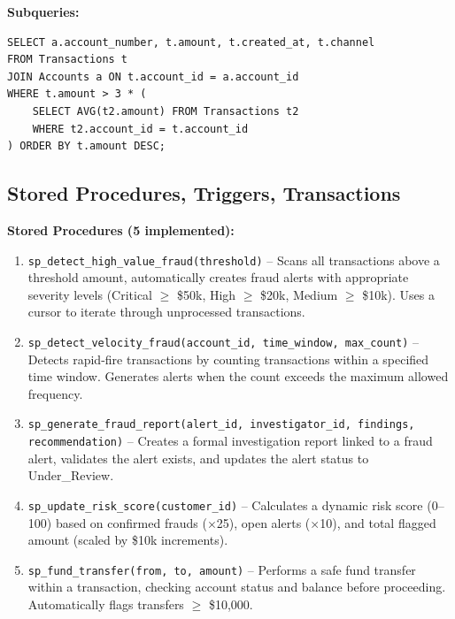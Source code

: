 \documentclass[a4paper,12pt]{article}
\begin{document}
\textbf{Subqueries:}
\begin{lstlisting}[style=sqlstyle, caption=Accounts with transactions exceeding 3x their average]
SELECT a.account_number, t.amount, t.created_at, t.channel
FROM Transactions t
JOIN Accounts a ON t.account_id = a.account_id
WHERE t.amount > 3 * (
    SELECT AVG(t2.amount) FROM Transactions t2 
    WHERE t2.account_id = t.account_id
) ORDER BY t.amount DESC;
\end{lstlisting}

\subsection{Stored Procedures, Triggers, Transactions}

\textbf{Stored Procedures (5 implemented):}

\begin{enumerate}
    \item \texttt{sp\_detect\_high\_value\_fraud(threshold)} -- Scans all transactions above a threshold amount, automatically creates fraud alerts with appropriate severity levels (Critical $\geq$ \$50k, High $\geq$ \$20k, Medium $\geq$ \$10k). Uses a cursor to iterate through unprocessed transactions.
    
    \item \texttt{sp\_detect\_velocity\_fraud(account\_id, time\_window, max\_count)} -- Detects rapid-fire transactions by counting transactions within a specified time window. Generates alerts when the count exceeds the maximum allowed frequency.
    
    \item \texttt{sp\_generate\_fraud\_report(alert\_id, investigator\_id, findings, recommendation)} -- Creates a formal investigation report linked to a fraud alert, validates the alert exists, and updates the alert status to Under\_Review.
    
    \item \texttt{sp\_update\_risk\_score(customer\_id)} -- Calculates a dynamic risk score (0--100) based on confirmed frauds ($\times$25), open alerts ($\times$10), and total flagged amount (scaled by \$10k increments).
    
    \item \texttt{sp\_fund\_transfer(from, to, amount)} -- Performs a safe fund transfer within a transaction, checking account status and balance before proceeding. Automatically flags transfers $\geq$ \$10,000.
\end{enumerate}
\end{document}
